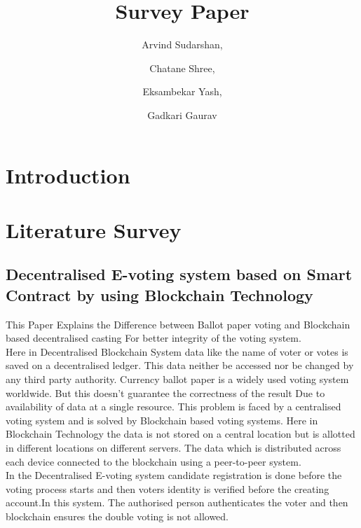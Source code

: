 \documentclass{IEEEtran}
\title{Survey Paper}
\author{
  Arvind Sudarshan,
  \and
  Chatane Shree,
  \and
  Eksambekar Yash,
  \and
  Gadkari Gaurav
}
\begin{document}
  \maketitle

  \begin{abstract}
  \end{abstract}
  \begin{IEEEkeywords}
  \end{IEEEkeywords}

  \section{Introduction}

  \section{Literature Survey}

    \subsection{Decentralised E-voting system based on Smart Contract by using Blockchain Technology \cite{9299581}}
      This Paper Explains the Difference between Ballot paper voting and Blockchain based decentralised casting For better integrity of the voting system.\\
      Here in Decentralised Blockchain System data like the name of voter or votes is saved on a decentralised ledger. This data neither be accessed nor be changed by any third party authority. Currency ballot paper is a widely used voting system worldwide. But this doesn't guarantee the correctness of the result Due to availability of data at a single resource. This problem is faced by a centralised voting system and is solved by Blockchain based voting systems. Here in Blockchain Technology the data is not stored on a central location but is allotted in different locations on different servers. The data which is distributed across each device connected to the blockchain using a peer-to-peer system.\\
      In the Decentralised E-voting system candidate registration is done before the voting process starts and then voters identity is verified before the creating account.In this system. The authorised person authenticates the voter and then blockchain ensures the double voting is not allowed.
\end{document}
